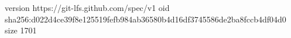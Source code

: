 version https://git-lfs.github.com/spec/v1
oid sha256:d022d4ce39f8e125519fefb984ab36580b4d16df3745586de2ba8fccb4df04d0
size 1701
